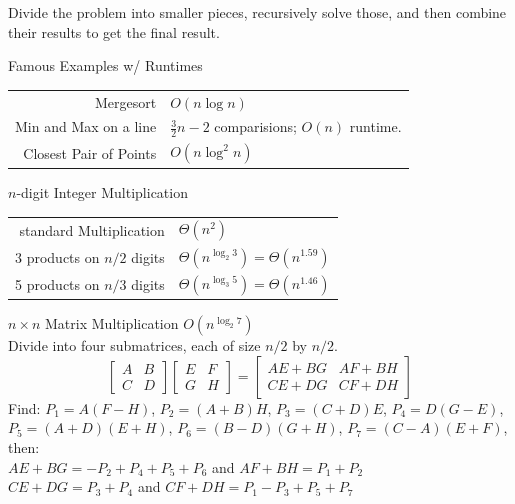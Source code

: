 \documentclass[10pt,a4paper]{article}
\begin{document}
\begin{multicols}{3}
    \begin{textbox}{}
         Divide the problem into smaller pieces, recursively solve those, and then combine their results to get the final result.\\
    \end{textbox}

    \begin{textbox}{Famous Examples w/ Runtimes}
        \begin{tabular}{r|p{}}\scriptsize
            Mergesort              & $O(n\log n)$                                     \\
            Min and Max on a line  & $\frac{3}{2}n - 2$ comparisions; $O(n)$ runtime. \\
            Closest Pair of Points & $O(n \log^2 n)$                                  \\
        \end{tabular}
    \end{textbox}

    \begin{textbox}{$n$-digit Integer Multiplication}
        \begin{tabular}{r|p{}}\scriptsize
            standard Multiplication    & $\Theta(n^2)$                             \\
            3 products on $n/2$ digits & $\Theta(n^{\log_2 3}) = \Theta(n^{1.59})$ \\
            5 products on $n/3$ digits & $\Theta(n^{\log_3 5}) = \Theta(n^{1.46})$ \\
        \end{tabular}
        \linebreak
    \end{textbox}

    \begin{textbox}{$n \times n$ Matrix Multiplication}
          $O(n^{\log_2 7})$ \\
        Divide into four submatrices, each of size $n/2$ by $n/2$.
        $$
            \left[ \begin{array} {cc} A & B \\ C & D \end{array} \right ]
            \left[ \begin{array} {cc} E & F \\ G & H \end{array} \right ]
            =
            \left[ \begin{array} {cc} AE+BG & AF+BH \\ CE+DG & CF+DH \end{array} \right ]
        $$
        Find: $P_1 = A(F-H)$, $P_2 = (A+B)H$, $P_3 = (C+D)E$, $P_4 = D(G-E)$, $P_5 = (A+D)(E+H)$, $P_6 = (B-D)(G+H)$, $P_7 = (C-A)(E+F)$, then: \\
        \linebreak
        $AE+BG = -P_2 + P_4 + P_5 + P_6$ and $AF +BH = P_1 + P_2$\\
        $CE+DG = P_3 + P_4$ and $CF +DH = P_1 - P_3 + P_5 + P_7$\\
    \end{textbox}


\end{multicols}
\end{document}
